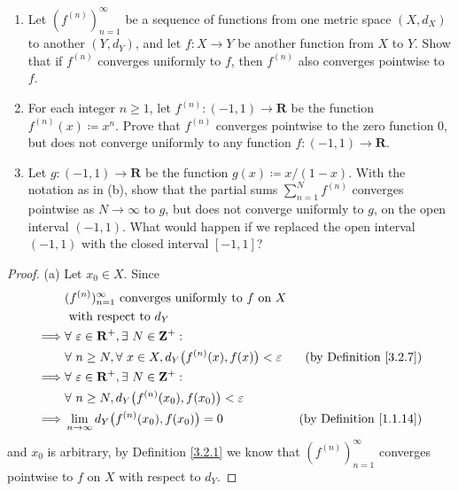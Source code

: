 \begin{exercise}\label{ex 3.2.2}
    \quad
    \begin{enumerate}
        \item Let \((f^{(n)})_{n = 1}^\infty\) be a sequence of functions from one metric space \((X, d_X)\) to another \((Y, d_Y)\), and let \(f : X \to Y\) be another function from \(X\) to \(Y\).
              Show that if \(f^{(n)}\) converges uniformly to \(f\), then \(f^{(n)}\) also converges pointwise to \(f\).
        \item For each integer \(n \geq 1\), let \(f^{(n)} : (-1, 1) \to \mathbf{R}\) be the function \(f^{(n)}(x) \coloneqq x^n\).
              Prove that \(f^{(n)}\) converges pointwise to the zero function \(0\), but does not converge uniformly to any function \(f : (-1, 1) \to \mathbf{R}\).
        \item Let \(g : (-1, 1) \to \mathbf{R}\) be the function \(g(x) \coloneqq x / (1 - x)\).
              With the notation as in (b), show that the partial sums \(\sum_{n = 1}^N f^{(n)}\) converges pointwise as \(N \to \infty\) to \(g\), but does not converge uniformly to \(g\), on the open interval \((-1, 1)\).
              What would happen if we replaced the open interval \((-1, 1)\) with the closed interval \([-1, 1]\)?
    \end{enumerate}
\end{exercise}

\begin{proof}{(a)}
    Let \(x_0 \in X\).
    Since
    \begin{align*}
                 & (f^{(n)})_{n = 1}^\infty \text{ converges uniformly to } f \text{ on } X                                               \\
                 & \text{ with respect to } d_Y                                                                                           \\
        \implies & \forall\ \varepsilon \in \mathbf{R}^+, \exists\ N \in \mathbf{Z}^+ :                                                   \\
                 & \forall\ n \geq N, \forall\ x \in X, d_Y\big(f^{(n)}(x), f(x)\big) < \varepsilon & \text{(by Definition \ref{3.2.7})}  \\
        \implies & \forall\ \varepsilon \in \mathbf{R}^+, \exists\ N \in \mathbf{Z}^+ :                                                   \\
                 & \forall\ n \geq N, d_Y\big(f^{(n)}(x_0), f(x_0)\big) < \varepsilon                                                     \\
        \implies & \lim_{n \to \infty} d_Y\big(f^{(n)}(x_0), f(x_0)\big) = 0                        & \text{(by Definition \ref{1.1.14})}
    \end{align*}
    and \(x_0\) is arbitrary, by Definition \ref{3.2.1} we know that \((f^{(n)})_{n = 1}^\infty\) converges pointwise to \(f\) on \(X\) with respect to \(d_Y\).
\end{proof}

